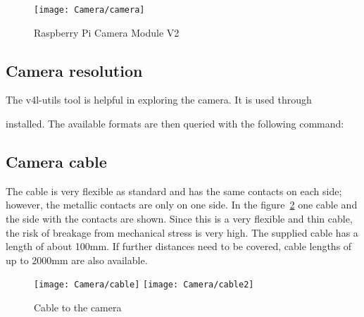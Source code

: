 
\begin{figure}
	\centering
	\texttt{[image: Camera/camera]} 
	\caption{Raspberry Pi Camera Module V2\cite{RaspberryPi3:2019}}\label{SmartPiCam:Camera}
\end{figure}


\subsection{Camera resolution}

The v4l-utils tool is helpful in exploring the camera. It is used through


\medskip
    
    
    \medskip

installed. The available formats are then queried with the following command:

\medskip






\subsection{Camera cable}


The cable is very flexible as standard and has the same contacts on each side; however, the metallic contacts are only on one side. In the figure~\ref{SmartPiCam:Camera} one cable and the side with the contacts are shown.  Since this is a very flexible and thin cable, the risk of breakage from mechanical stress is very high. The supplied cable has a length of about 100mm. If further distances need to be covered, cable lengths of up to 2000mm are also available. 

\begin{figure}
    \centering
    \texttt{[image: Camera/cable]} 
    \quad 
    \texttt{[image: Camera/cable2]} 
    \caption{Cable to the camera \cite{RaspberryPi3:2019}}\label{SmartPiCam:Camera}
\end{figure}


